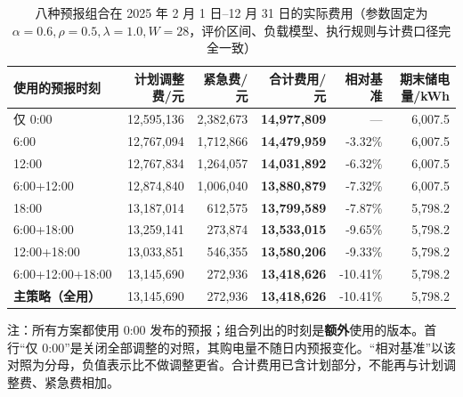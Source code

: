 
\begin{table}[htbp]
  \centering
  \caption{八种预报组合在 2025 年 2 月 1 日--12 月 31 日的实际费用（参数固定为 $\alpha=0.6,\rho=0.5,\lambda=1.0,W=28$，评价区间、负载模型、执行规则与计费口径完全一致）}
  \label{tab:p3-combo}
  \small
  \begin{tabular}{lrrrrr}
    \toprule
    使用的预报时刻 & 计划调整费/元 & 紧急费/元 & 合计费用/元 & 相对基准 & 期末储电量/kWh \\
    \midrule
    仅 0{:}00 & 12,595,136 & 2,382,673 & \textbf{14,977,809} & --- & 6,007.5 \\
    6{:}00 & 12,767,094 & 1,712,866 & \textbf{14,479,959} & -3.32\% & 6,007.5 \\
    12{:}00 & 12,767,834 & 1,264,057 & \textbf{14,031,892} & -6.32\% & 6,007.5 \\
    6{:}00+12{:}00 & 12,874,840 & 1,006,040 & \textbf{13,880,879} & -7.32\% & 6,007.5 \\
    18{:}00 & 13,187,014 & 612,575 & \textbf{13,799,589} & -7.87\% & 5,798.2 \\
    6{:}00+18{:}00 & 13,259,141 & 273,874 & \textbf{13,533,015} & -9.65\% & 5,798.2 \\
    12{:}00+18{:}00 & 13,033,851 & 546,355 & \textbf{13,580,206} & -9.33\% & 5,798.2 \\
    6{:}00+12{:}00+18{:}00 & 13,145,690 & 272,936 & \textbf{13,418,626} & -10.41\% & 5,798.2 \\
    \midrule
    \textbf{主策略（全用）} & 13,145,690 & 272,936 & \textbf{13,418,626} & -10.41\% & 5,798.2 \\
    \bottomrule
  \end{tabular}
  \par\vspace{2pt}
  \begin{minipage}{\textwidth}\footnotesize
    注：所有方案都使用 0:00 发布的预报；组合列出的时刻是\textbf{额外}使用的版本。首行“仅 0:00”是关闭全部调整的对照，其购电量不随日内预报变化。“相对基准”以该对照为分母，负值表示比不做调整更省。合计费用已含计划部分，不能再与计划调整费、紧急费相加。
  \end{minipage}
\end{table}

